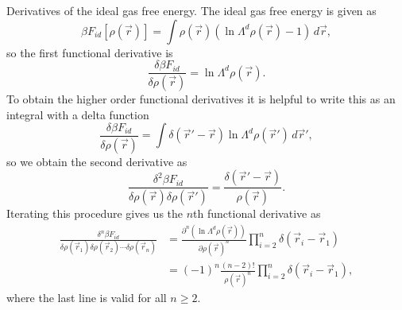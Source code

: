 \documentclass[12pt]{report}
\begin{document}
Derivatives of the ideal gas free energy.
The ideal gas free energy is given as
\begin{equation*}
  \beta F_{id}[\rho(\vec{r})] =
  \int \rho(\vec{r}) (\ln{\Lambda^d \rho(\vec{r})} - 1) \, d\vec{r},
\end{equation*}
so the first functional derivative is
\begin{equation*}
  \frac{\delta \beta F_{id}}{\delta \rho(\vec{r})} =
  \ln{\Lambda^d \rho(\vec{r})}.
\end{equation*}
To obtain the higher order functional derivatives it is helpful to write this as an integral with a delta function
\begin{equation*}
  \frac{\delta \beta F_{id}}{\delta \rho(\vec{r})} =
  \int \delta{(\vec{r}' - \vec{r})}
  \ln{\Lambda^d \rho(\vec{r}')} \, d\vec{r}',
\end{equation*}
so we obtain the second derivative as
\begin{equation*}
  \frac{\delta^2 \beta F_{id}}{\delta \rho(\vec{r}) \delta \rho(\vec{r}')} =
  \frac{\delta(\vec{r}'-\vec{r})}{\rho(\vec{r})}.
\end{equation*}
Iterating this procedure gives us the $n$th functional derivative as
\begin{equation}
  \begin{aligned}
    \frac{\delta^n \beta F_{id}}{\delta \rho(\vec{r}_1) \delta \rho(\vec{r}_2) \cdots \delta \rho(\vec{r}_n)} &=
    \frac{\partial^n (\ln{\Lambda^d \rho(\vec{r})})}{\partial \rho(\vec{r})^n}
    \prod_{i=2}^n \delta(\vec{r}_i - \vec{r}_1) \\
    &=
    (-1)^n
    \frac{(n-2)!}{\rho(\vec{r})^n}
    \prod_{i=2}^n \delta(\vec{r}_i - \vec{r}_1),
  \end{aligned}
\end{equation}
where the last line is valid for all $n \ge 2$.
\end{document}
